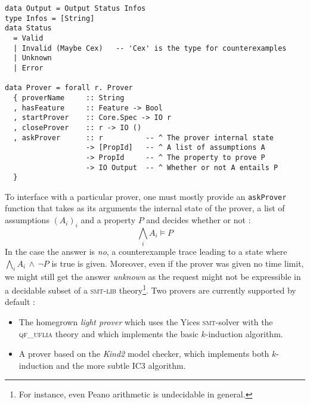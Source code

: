 \begin{lstlisting}[frame=single]
data Output = Output Status Infos
type Infos = [String]
data Status
  = Valid
  | Invalid (Maybe Cex)   -- 'Cex' is the type for counterexamples
  | Unknown
  | Error
  
data Prover = forall r. Prover 
  { proverName     :: String
  , hasFeature     :: Feature -> Bool
  , startProver    :: Core.Spec -> IO r
  , closeProver    :: r -> IO () 
  , askProver      :: r          -- ^ The prover internal state
                   -> [PropId]   -- ^ A list of assumptions A
                   -> PropId     -- ^ The property to prove P
                   -> IO Output  -- ^ Whether or not A entails P
  }

\end{lstlisting}

To interface with a particular prover, one must mostly provide an \texttt{askProver} function that
takes as its arguments the internal state of the prover, a list of assumptions $(A_i)_i$ and a property $P$ and decides whether or not : \[ \bigwedge_i A_i \models P  \] In the case the answer is \emph{no}, a counterexample trace leading to a state where $\bigwedge_i A_i \,\wedge\, \neg P$ is true is given. Moreover, even if the prover was given no time limit, we might still get the answer \emph{unknown} as the request might not be expressible in a decidable subset of a \textsc{smt-lib} theory\footnote{For instance, even Peano arithmetic is undecidable in general.}.
Two provers are currently supported by default :
\begin{itemize}
\item The homegrown \emph{light prover} which uses the Yices \textsc{smt}-solver with the \textsc{qf\_uflia} theory and which implements the basic $k$-induction algorithm.
\item A prover based on the \emph{Kind2} model checker, which implements both $k$-induction and the more subtle IC3 algorithm.
\end{itemize}


